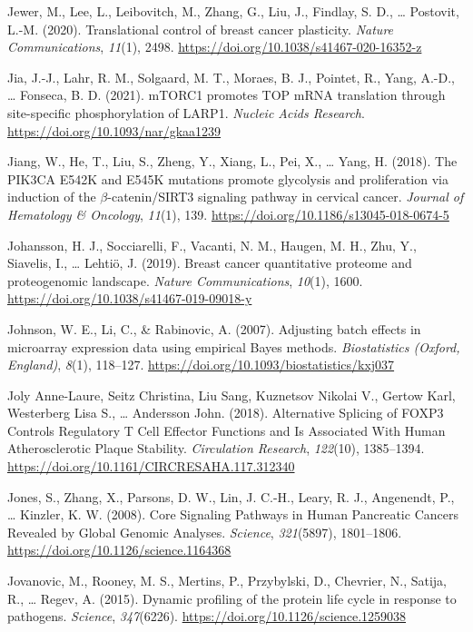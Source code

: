 \documentclass[12pt,openany]{book}
\begin{document}
\hypertarget{ref-Jewer2020}{}
Jewer, M., Lee, L., Leibovitch, M., Zhang, G., Liu, J., Findlay, S. D.,
\ldots{} Postovit, L.-M. (2020). Translational control of breast cancer
plasticity. \emph{Nature Communications}, \emph{11}(1), 2498.
\url{https://doi.org/10.1038/s41467-020-16352-z}

\hypertarget{ref-Jia2021}{}
Jia, J.-J., Lahr, R. M., Solgaard, M. T., Moraes, B. J., Pointet, R.,
Yang, A.-D., \ldots{} Fonseca, B. D. (2021). mTORC1 promotes TOP mRNA
translation through site-specific phosphorylation of LARP1.
\emph{Nucleic Acids Research}.
\url{https://doi.org/10.1093/nar/gkaa1239}

\hypertarget{ref-Jiang2018}{}
Jiang, W., He, T., Liu, S., Zheng, Y., Xiang, L., Pei, X., \ldots{}
Yang, H. (2018). The PIK3CA E542K and E545K mutations promote glycolysis
and proliferation via induction of the \(\beta\)-catenin/SIRT3 signaling
pathway in cervical cancer. \emph{Journal of Hematology \& Oncology},
\emph{11}(1), 139. \url{https://doi.org/10.1186/s13045-018-0674-5}

\hypertarget{ref-Johansson2019}{}
Johansson, H. J., Socciarelli, F., Vacanti, N. M., Haugen, M. H., Zhu,
Y., Siavelis, I., \ldots{} Lehtiö, J. (2019). Breast cancer quantitative
proteome and proteogenomic landscape. \emph{Nature Communications},
\emph{10}(1), 1600. \url{https://doi.org/10.1038/s41467-019-09018-y}

\hypertarget{ref-Johnson2007}{}
Johnson, W. E., Li, C., \& Rabinovic, A. (2007). Adjusting batch effects
in microarray expression data using empirical Bayes methods.
\emph{Biostatistics (Oxford, England)}, \emph{8}(1), 118--127.
\url{https://doi.org/10.1093/biostatistics/kxj037}

\hypertarget{ref-JolyAnne-Laure2018}{}
Joly Anne-Laure, Seitz Christina, Liu Sang, Kuznetsov Nikolai V., Gertow
Karl, Westerberg Lisa S., \ldots{} Andersson John. (2018). Alternative
Splicing of FOXP3 Controls Regulatory T Cell Effector Functions and Is
Associated With Human Atherosclerotic Plaque Stability.
\emph{Circulation Research}, \emph{122}(10), 1385--1394.
\url{https://doi.org/10.1161/CIRCRESAHA.117.312340}

\hypertarget{ref-Jones2008}{}
Jones, S., Zhang, X., Parsons, D. W., Lin, J. C.-H., Leary, R. J.,
Angenendt, P., \ldots{} Kinzler, K. W. (2008). Core Signaling Pathways
in Human Pancreatic Cancers Revealed by Global Genomic Analyses.
\emph{Science}, \emph{321}(5897), 1801--1806.
\url{https://doi.org/10.1126/science.1164368}

\hypertarget{ref-Jovanovic2015}{}
Jovanovic, M., Rooney, M. S., Mertins, P., Przybylski, D., Chevrier, N.,
Satija, R., \ldots{} Regev, A. (2015). Dynamic profiling of the protein
life cycle in response to pathogens. \emph{Science}, \emph{347}(6226).
\url{https://doi.org/10.1126/science.1259038}
\end{document}
